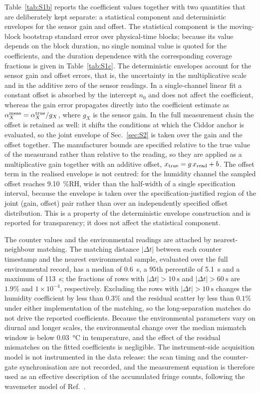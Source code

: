 \documentclass[aps,prapplied,reprint,superscriptaddress]{revtex4-2}
\begin{document}
Table~\ref{tab:S1b} reports the coefficient values together with two quantities that are deliberately kept separate: a statistical component and deterministic envelopes for the sensor gain and offset. The statistical component is the moving-block bootstrap standard error over physical-time blocks; because its value depends on the block duration, no single nominal value is quoted for the coefficients, and the duration dependence with the corresponding coverage fractions is given in Table~\ref{tab:S1c}. The deterministic envelopes account for the sensor gain and offset errors, that is, the uncertainty in the multiplicative scale and in the additive zero of the sensor readings. In a single-channel linear fit a constant offset is absorbed by the intercept $n_0$ and does not affect the coefficient, whereas the gain error propagates directly into the coefficient estimate as $\alpha_X^{\rm meas} = \alpha_X^{\rm true}/g_X$, where $g_X$ is the sensor gain. In the full measurement chain the offset is retained as well: it shifts the conditions at which the Ciddor anchor is evaluated, so the joint envelope of Sec.~\ref{sec:S2} is taken over the gain and the offset together. The manufacturer bounds are specified relative to the true value of the measurand rather than relative to the reading, so they are applied as a multiplicative gain together with an additive offset, $x_{\rm true} = g\,x_{\rm read} + b$. The offset term in the realised envelope is not centred: for the humidity channel the sampled offset reaches \SI{9.10}{\percent}RH, wider than the half-width of a single specification interval, because the envelope is taken over the specification-justified region of the joint (gain, offset) pair rather than over an independently specified offset distribution. This is a property of the deterministic envelope construction and is reported for transparency; it does not affect the statistical component.

The counter values and the environmental readings are attached by nearest-neighbour matching. The matching distance $|\Delta t|$ between each counter timestamp and the nearest environmental sample, evaluated over the full environmental record, has a median of \SI{0.6}{\second}, a $95$th percentile of \SI{5.1}{\second} and a maximum of \SI{113}{\second}; the fractions of rows with $|\Delta t| > \SI{10}{\second}$ and $|\Delta t| > \SI{60}{\second}$ are $1.9\%$ and $1\times10^{-4}$, respectively. Excluding the rows with $|\Delta t| > \SI{10}{\second}$ changes the humidity coefficient by less than $0.3\%$ and the residual scatter by less than $0.1\%$ under either implementation of the matching, so the long-separation matches do not drive the reported coefficients. Because the environmental parameters vary on diurnal and longer scales, the environmental change over the median mismatch window is below \SI{0.03}{\celsius} in temperature, and the effect of the residual mismatches on the fitted coefficients is negligible. The instrument-side acquisition model is not instrumented in the data release: the scan timing and the counter-gate synchronisation are not recorded, and the measurement equation is therefore used as an effective description of the accumulated fringe counts, following the wavemeter model of Ref.~\cite{fox1999reliable}.
\end{document}
